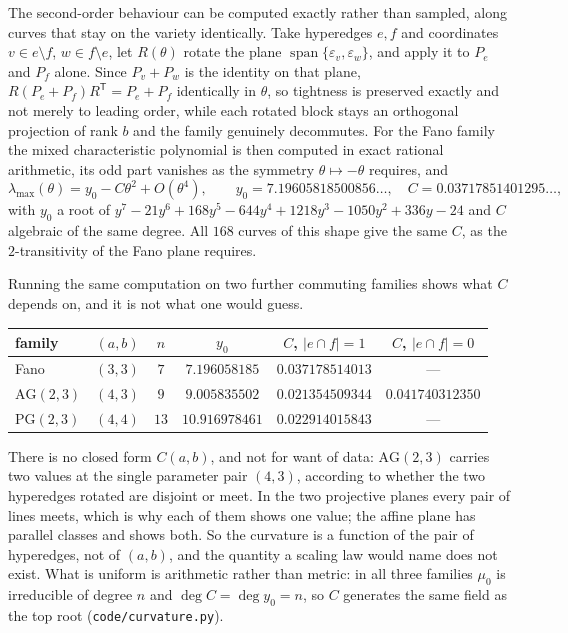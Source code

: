 \documentclass[11pt]{article}
\theoremstyle{remark}
\begin{document}
The second-order behaviour can be computed exactly rather than sampled, along curves that stay on
the variety identically. Take hyperedges $e,f$ and coordinates $v\in e\setminus f$,
$w\in f\setminus e$, let $R(\theta)$ rotate the plane $\operatorname{span}\{\varepsilon_v,
\varepsilon_w\}$, and apply it to $P_e$ and $P_f$ alone. Since $P_v+P_w$ is the identity on that
plane, $R(P_e+P_f)R^{\mathsf T}=P_e+P_f$ identically in $\theta$, so tightness is preserved
exactly and not merely to leading order, while each rotated block stays an orthogonal projection
of rank $b$ and the family genuinely decommutes. For the Fano family the mixed characteristic
polynomial is then computed in exact rational arithmetic, its odd part vanishes as the symmetry
$\theta\mapsto-\theta$ requires, and
\[
\lambda_{\max}(\theta)=y_0-C\theta^2+O(\theta^4),\qquad
y_0=7.19605818500856\ldots,\quad C=0.03717851401295\ldots,
\]
with $y_0$ a root of $y^7-21y^6+168y^5-644y^4+1218y^3-1050y^2+336y-24$ and $C$ algebraic of the
same degree. All $168$ curves of this shape give the same $C$, as the $2$-transitivity of the Fano
plane requires.

Running the same computation on two further commuting families shows what $C$ depends on, and it
is not what one would guess.
\begin{center}
\begin{tabular}{lccccc}
family & $(a,b)$ & $n$ & $y_0$ & $C$, $|e\cap f|=1$ & $C$, $|e\cap f|=0$\\
\hline
Fano & $(3,3)$ & $7$ & $7.196058185$ & $0.037178514013$ & ---\\
$\mathrm{AG}(2,3)$ & $(4,3)$ & $9$ & $9.005835502$ & $0.021354509344$ & $0.041740312350$\\
$\mathrm{PG}(2,3)$ & $(4,4)$ & $13$ & $10.916978461$ & $0.022914015843$ & ---\\
\hline
\end{tabular}
\end{center}
There is no closed form $C(a,b)$, and not for want of data: $\mathrm{AG}(2,3)$ carries two values
at the single parameter pair $(4,3)$, according to whether the two hyperedges rotated are disjoint
or meet. In the two projective planes every pair of lines meets, which is why each of them shows
one value; the affine plane has parallel classes and shows both. So the curvature is a function of
the pair of hyperedges, not of $(a,b)$, and the quantity a scaling law would name does not exist.
What is uniform is arithmetic rather than metric: in all three families $\mu_0$ is irreducible of
degree $n$ and $\deg C=\deg y_0=n$, so $C$ generates the same field as the top root
(\texttt{code/curvature.py}).
\end{document}
